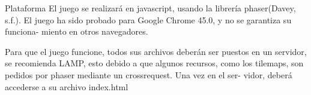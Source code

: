 \begin{section}{Plataforma}
  El juego se realizará en javascript, usando la librería phaser(Davey, s.f.). El juego ha sido probado para Google Chrome 45.0, y no se garantiza su funciona- miento en otros navegadores. 

  Para que el juego funcione, todos sus archivos deberán ser puestos en un servidor, se recomienda LAMP, esto debido a que algunos recursos, como los tilemaps, son pedidos por phaser mediante un crossrequest. Una vez en el ser- vidor, deberá accederse a su archivo index.html
\end{section}
